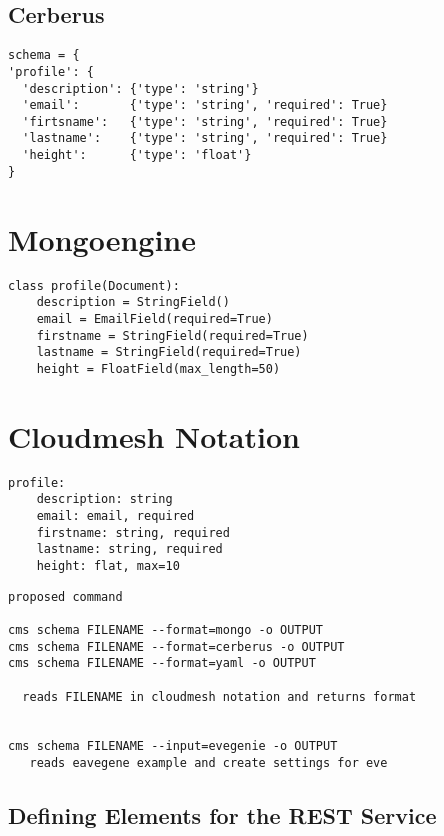 \documentclass[9pt,twocolumn,twoside]{styles/osajnl}
\begin{document}
\subsection{Cerberus}

\begin{Verbatim}
schema = {
'profile': {
  'description': {'type': 'string'}
  'email':       {'type': 'string', 'required': True}
  'firtsname':   {'type': 'string', 'required': True}
  'lastname':    {'type': 'string', 'required': True}
  'height':      {'type': 'float'}
}
\end{Verbatim}

\section{Mongoengine}

\begin{Verbatim}
class profile(Document):
    description = StringField()
    email = EmailField(required=True)
    firstname = StringField(required=True)
    lastname = StringField(required=True)
    height = FloatField(max_length=50)
\end{Verbatim}

\section{Cloudmesh Notation}

\begin{Verbatim}
profile:
    description: string
    email: email, required
    firstname: string, required
    lastname: string, required
    height: flat, max=10
\end{Verbatim}

\begin{Verbatim}
proposed command

cms schema FILENAME --format=mongo -o OUTPUT
cms schema FILENAME --format=cerberus -o OUTPUT
cms schema FILENAME --format=yaml -o OUTPUT

  reads FILENAME in cloudmesh notation and returns format


cms schema FILENAME --input=evegenie -o OUTPUT
   reads eavegene example and create settings for eve
\end{Verbatim}


\subsection{Defining Elements for the REST Service}
\end{document}
